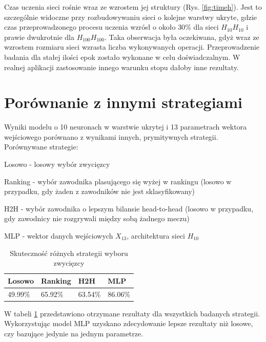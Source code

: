 Czas uczenia sieci rośnie wraz ze wzrostem jej struktury (Rys. \ref{fig:timeh}). Jest to szczególnie widoczne przy rozbudowywaniu sieci o kolejne warstwy ukryte, gdzie czas przeprowadzonego procesu uczenia wzrósł o około $30\%$ dla sieci $H_{10}H_{10}$ i prawie dwukrotnie dla $H_{100}H_{100}$. Taka obserwacja była oczekiwana, gdyż wraz ze wzrostem rozmiaru sieci wzrasta liczba wykonywanych operacji. Przeprowadzenie badania dla stałej ilości epok zostało wykonane w celu doświadczalnym. W realnej aplikacji zastosowanie innego warunku stopu dałoby inne rezultaty.

\section{Porównanie z innymi strategiami}
\label{Sec:VsStrat}
Wyniki modelu o 10 neuronach w warstwie ukrytej i 13 parametrach wektora wejściowego porównano z wynikami innych, prymitywnych strategii. Porównywane strategie:
\begin{tightitemize}
\item Losowo - losowy wybór zwycięzcy
\item Ranking - wybór zawodnika plasującego się wyżej w rankingu (losowo w przypadku, gdy żaden z zawodników nie jest sklasyfikowany)
\item H2H - wybór zawodnika o lepszym bilansie head-to-head (losowo w przypadku, gdy zawodnicy nie rozgrywali między sobą żadnego meczu)
\item MLP - wektor danych wejściowych $X_{13}$, architektura sieci $H_{10}$
\end{tightitemize}

\begin{table}[H]
\centering
\caption{Skuteczność różnych strategii wyboru zwycięzcy}
\label{tab:scores}
\begin{tabular}{|l|l|l|l|}
\hline
\textbf{Losowo} & \textbf{Ranking} & \textbf{H2H} & \textbf{MLP} \\ \hline
49.99\%          & 65.92\%            & 63.54\%        & 86.06\%        \\ \hline
\end{tabular}
\end{table}

W tabeli \ref{tab:scores} przedstawiono otrzymane rezultaty dla wszystkich badanych strategii. Wykorzystując model MLP uzyskano zdecydowanie lepsze rezultaty niż losowe, czy bazujące jedynie na jednym parametrze.

